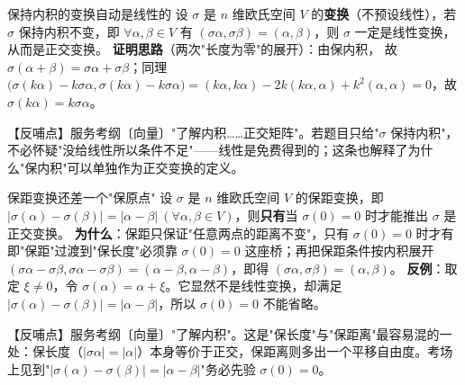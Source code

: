 \begin{fdeep}{保持内积的变换自动是线性的}
设 $\sigma$ 是 $n$ 维欧氏空间 $V$ 的\textbf{变换}（不预设线性），若 $\sigma$ 保持内积不变，即 $\forall\alpha,\beta\in V$ 有 $(\sigma\alpha,\sigma\beta)=(\alpha,\beta)$，则 $\sigma$ 一定是线性变换，从而是正交变换。
\textbf{证明思路}（两次"长度为零"的展开）：由保内积，
故 $\sigma(\alpha+\beta)=\sigma\alpha+\sigma\beta$；同理
$\bigl(\sigma(k\alpha)-k\sigma\alpha,\sigma(k\alpha)-k\sigma\alpha\bigr)=(k\alpha,k\alpha)-2k(k\alpha,\alpha)+k^{2}(\alpha,\alpha)=0$，故 $\sigma(k\alpha)=k\sigma\alpha$。

【反哺点】服务考纲〔向量〕"了解内积……正交矩阵"。若题目只给"$\sigma$ 保持内积"，不必怀疑"没给线性所以条件不足"——线性是免费得到的；这条也解释了为什么"保内积"可以单独作为正交变换的定义。
\end{fdeep}


\begin{fdeep}{保距变换还差一个"保原点"}
设 $\sigma$ 是 $n$ 维欧氏空间 $V$ 的保距变换，即 $|\sigma(\alpha)-\sigma(\beta)|=|\alpha-\beta|\ (\forall\alpha,\beta\in V)$，则\textbf{只有}当 $\sigma(0)=0$ 时才能推出 $\sigma$ 是正交变换。
\textbf{为什么}：保距只保证"任意两点的距离不变"，只有 $\sigma(0)=0$ 时才有
即"保距"过渡到"保长度"必须靠 $\sigma(0)=0$ 这座桥；再把保距条件按内积展开
$(\sigma\alpha-\sigma\beta,\sigma\alpha-\sigma\beta)=(\alpha-\beta,\alpha-\beta)$，即得 $(\sigma\alpha,\sigma\beta)=(\alpha,\beta)$。
\textbf{反例}：取定 $\xi\ne0$，令 $\sigma(\alpha)=\alpha+\xi$。它显然不是线性变换，却满足 $|\sigma(\alpha)-\sigma(\beta)|=|\alpha-\beta|$，所以 $\sigma(0)=0$ 不能省略。

【反哺点】服务考纲〔向量〕"了解内积"。这是"保长度"与"保距离"最容易混的一处：保长度（$|\sigma\alpha|=|\alpha|$）本身等价于正交，保距离则多出一个平移自由度。考场上见到"$|\sigma(\alpha)-\sigma(\beta)|=|\alpha-\beta|$"务必先验 $\sigma(0)=0$。
\end{fdeep}



